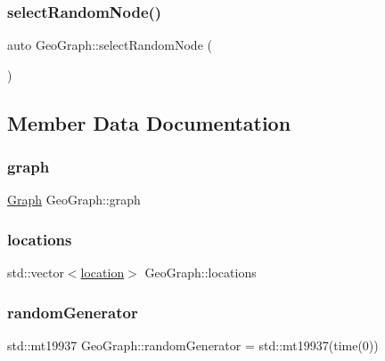 \mbox{\label{class_geo_graph_ae796c8a1012d1c3d1550a5647cfaa45f}} 
\subsubsection{\texorpdfstring{selectRandomNode()}{selectRandomNode()}}
{\footnotesize\ttfamily auto Geo\+Graph\+::select\+Random\+Node (\begin{DoxyParamCaption}{ }\end{DoxyParamCaption})\hspace{0.3cm}{\ttfamily [inline]}}



\subsection{Member Data Documentation}
\mbox{\label{class_geo_graph_ac58f6685615da10b71249b20e53932c9}} 
\subsubsection{\texorpdfstring{graph}{graph}}
{\footnotesize\ttfamily \mbox{\hyperlink{class_geo_graph_a4f8c3bf1eb9f30bc227f300d7460debb}{Graph}} Geo\+Graph\+::graph}

\mbox{\label{class_geo_graph_ac64769457cf6a23a877a03262b44c517}} 
\subsubsection{\texorpdfstring{locations}{locations}}
{\footnotesize\ttfamily std\+::vector$<$\mbox{\hyperlink{struct_geo_graph_1_1location}{location}}$>$ Geo\+Graph\+::locations}

\mbox{\label{class_geo_graph_abb9d028dbedb4b6544f9a19c167774ba}} 
\subsubsection{\texorpdfstring{randomGenerator}{randomGenerator}}
{\footnotesize\ttfamily std\+::mt19937 Geo\+Graph\+::random\+Generator = std\+::mt19937(time(0))}

